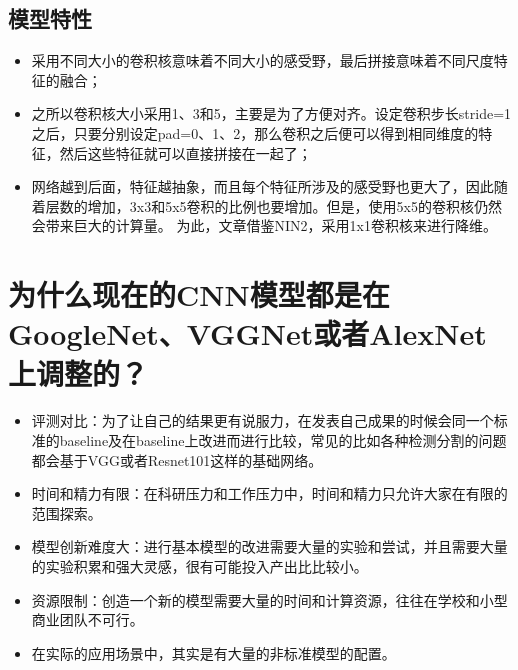 \documentclass[12pt,a4paper,UTF8,twoside]{book}
\providecommand{\tightlist}{%
  \setlength{\itemsep}{0pt}\setlength{\parskip}{0pt}}
\begin{document}
\hypertarget{ux6a21ux578bux7279ux6027-4}{%
\subsection{模型特性}\label{ux6a21ux578bux7279ux6027-4}}

\begin{itemize}
\tightlist
\item
  采用不同大小的卷积核意味着不同大小的感受野，最后拼接意味着不同尺度特征的融合；
\item
  之所以卷积核大小采用1、3和5，主要是为了方便对齐。设定卷积步长stride=1之后，只要分别设定pad=0、1、2，那么卷积之后便可以得到相同维度的特征，然后这些特征就可以直接拼接在一起了；
\item
  网络越到后面，特征越抽象，而且每个特征所涉及的感受野也更大了，因此随着层数的增加，3x3和5x5卷积的比例也要增加。但是，使用5x5的卷积核仍然会带来巨大的计算量。 为此，文章借鉴NIN2，采用1x1卷积核来进行降维。
\end{itemize}

\hypertarget{ux4e3aux4ec0ux4e48ux73b0ux5728ux7684cnnux6a21ux578bux90fdux662fux5728googlenetvggnetux6216ux8005alexnetux4e0aux8c03ux6574ux7684}{%
\section{为什么现在的CNN模型都是在GoogleNet、VGGNet或者AlexNet上调整的？}\label{ux4e3aux4ec0ux4e48ux73b0ux5728ux7684cnnux6a21ux578bux90fdux662fux5728googlenetvggnetux6216ux8005alexnetux4e0aux8c03ux6574ux7684}}

\begin{itemize}
\tightlist
\item
  评测对比：为了让自己的结果更有说服力，在发表自己成果的时候会同一个标准的baseline及在baseline上改进而进行比较，常见的比如各种检测分割的问题都会基于VGG或者Resnet101这样的基础网络。
\item
  时间和精力有限：在科研压力和工作压力中，时间和精力只允许大家在有限的范围探索。
\item
  模型创新难度大：进行基本模型的改进需要大量的实验和尝试，并且需要大量的实验积累和强大灵感，很有可能投入产出比比较小。
\item
  资源限制：创造一个新的模型需要大量的时间和计算资源，往往在学校和小型商业团队不可行。
\item
  在实际的应用场景中，其实是有大量的非标准模型的配置。
\end{itemize}


\backmatter
\end{document}
